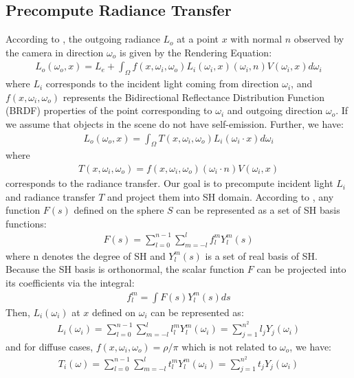 \subsection{Precompute Radiance Transfer}
According to \cite{kajiya1986rendering}, the outgoing radiance $L_o$ at a point $x$ with normal $n$ observed by the camera in direction $\omega_o$ is given by the Rendering Equation:
\begin{align}
    L_o(\omega_o,x)=L_e+\int_{\Omega}f(x,\omega_i,\omega_o)L_i(\omega_i,x)(\omega_i,n)V(\omega_i,x)d\omega_i  \label{rendering equation}
\end{align}
where $L_i$ corresponds to the incident light coming from direction $\omega_i$, and $f(x,\omega_i,\omega_o)$ represents the Bidirectional Reflectance Distribution Function (BRDF) properties of the point corresponding to $\omega_i$ and outgoing direction $\omega_o$. If we assume that objects in the scene do not have self-emission. Further, we have:
 \begin{align}
    L_o(\omega_o,x)=\int_{\Omega}T(x,\omega_i,\omega_o)L_i(\omega_i\cdot x)d\omega_i \label{rendering transfer equation}
\end{align}  
where 
\begin{align}
    T(x,\omega_i,\omega_o)=f(x,\omega_i,\omega_o)(\omega_i \cdot n)V(\omega_i,x)
\end{align} 
corresponds to the radiance transfer.
Our goal is to precompute incident light $L_i$ and radiance transfer $T$ and project them into SH domain. 
According to \cite{sloan2002precomputed}, any function $F(s)$ defined on the sphere $S$ can be represented as a set of SH basis functions:
\begin{align}
    F(s)=\sum_{l=0}^{n-1}\sum_{m=-l}^{l}f_l^mY_l^m(s)
\end{align}
where n denotes the degree of SH and $Y_l^m(s)$ is a set of real basis of SH.
Because the SH basis is orthonormal, the scalar function $F$ can be projected into its coefficients via the integral:
\begin{align}
    f_l^m=\int F(s)Y_l^m(s)ds \label{sh_jifen}
\end{align}  
Then, $L_i(\omega_i)$ at $x$ defined on $\omega_i$ can be represented as:
\begin{align}
    L_i(\omega_i)=\sum_{l=0}^{n-1}\sum_{m=-l}^{l}l_l^mY_l^m(\omega_i)=\sum_{j=1}^{n^2}l_jY_j(\omega_i) \label{sh2}
\end{align}
and for diffuse cases, $f(x,\omega_i,\omega_o)=\rho/\pi$ which is not related to $\omega_o$, we have: 
\begin{align}
    T_i(\omega)=\sum_{l=0}^{n-1}\sum_{m=-l}^{l}t_l^mY_l^m(\omega_i)=\sum_{j=1}^{n^2}t_jY_j(\omega_i) \label{prt sh}
\end{align}
